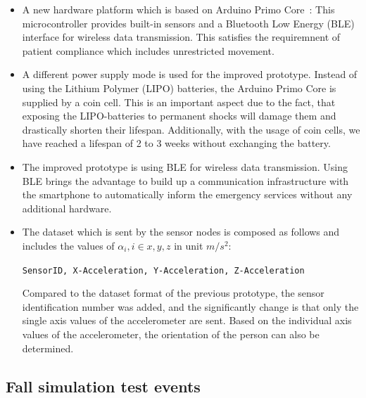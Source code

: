 \documentclass[journal]{IEEEtran}
\begin{document}
\begin{itemize}
 \item A new hardware platform which is based on Arduino Primo Core~\cite{Arduino2018}: 
 This microcontroller provides built-in sensors and a Bluetooth Low Energy (BLE) 
 interface for wireless data transmission. This satisfies the
 requiremnent of patient compliance
 which includes unrestricted movement.
 \item A different power supply mode is used for the improved prototype. Instead of 
 using the Lithium Polymer (LIPO) batteries, the Arduino Primo Core is supplied by a 
 coin cell. This is an important aspect due to the fact, that exposing the LIPO-batteries 
 to permanent shocks will damage them and drastically shorten their lifespan. 
 Additionally, with the usage of coin cells, we have reached a lifespan of 2 to 3 weeks 
 without exchanging the battery.
 \item The improved prototype is using BLE for wireless data transmission. Using BLE 
 brings the advantage to build up a communication infrastructure with the smartphone 
 to automatically inform the emergency services without any additional hardware.
 \item The dataset which is sent by the sensor nodes is composed as follows 
 and includes the values of $\alpha_{i}, i \in {x,y,z}$ in unit $m/s^{2}$:
 \begin{center}
  \texttt{\small{SensorID, X-Acceleration, Y-Acceleration, Z-Acceleration}}
 \end{center}
 Compared to the dataset format of the previous prototype, the sensor identification 
 number was added, and the significantly change is that only the single axis values of 
 the accelerometer are sent. Based on the individual axis values of the accelerometer, 
 the orientation of the person can also be determined. 
\end{itemize}

\subsection{Fall simulation test events}
\end{document}
